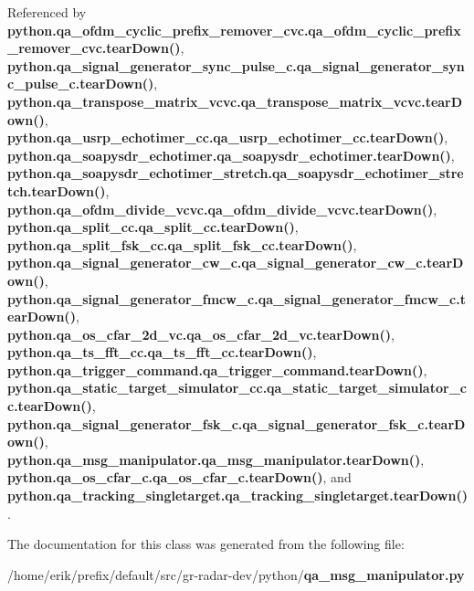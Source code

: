 Referenced by {\bf python.\+qa\+\_\+ofdm\+\_\+cyclic\+\_\+prefix\+\_\+remover\+\_\+cvc.\+qa\+\_\+ofdm\+\_\+cyclic\+\_\+prefix\+\_\+remover\+\_\+cvc.\+tear\+Down()}, {\bf python.\+qa\+\_\+signal\+\_\+generator\+\_\+sync\+\_\+pulse\+\_\+c.\+qa\+\_\+signal\+\_\+generator\+\_\+sync\+\_\+pulse\+\_\+c.\+tear\+Down()}, {\bf python.\+qa\+\_\+transpose\+\_\+matrix\+\_\+vcvc.\+qa\+\_\+transpose\+\_\+matrix\+\_\+vcvc.\+tear\+Down()}, {\bf python.\+qa\+\_\+usrp\+\_\+echotimer\+\_\+cc.\+qa\+\_\+usrp\+\_\+echotimer\+\_\+cc.\+tear\+Down()}, {\bf python.\+qa\+\_\+soapysdr\+\_\+echotimer.\+qa\+\_\+soapysdr\+\_\+echotimer.\+tear\+Down()}, {\bf python.\+qa\+\_\+soapysdr\+\_\+echotimer\+\_\+stretch.\+qa\+\_\+soapysdr\+\_\+echotimer\+\_\+stretch.\+tear\+Down()}, {\bf python.\+qa\+\_\+ofdm\+\_\+divide\+\_\+vcvc.\+qa\+\_\+ofdm\+\_\+divide\+\_\+vcvc.\+tear\+Down()}, {\bf python.\+qa\+\_\+split\+\_\+cc.\+qa\+\_\+split\+\_\+cc.\+tear\+Down()}, {\bf python.\+qa\+\_\+split\+\_\+fsk\+\_\+cc.\+qa\+\_\+split\+\_\+fsk\+\_\+cc.\+tear\+Down()}, {\bf python.\+qa\+\_\+signal\+\_\+generator\+\_\+cw\+\_\+c.\+qa\+\_\+signal\+\_\+generator\+\_\+cw\+\_\+c.\+tear\+Down()}, {\bf python.\+qa\+\_\+signal\+\_\+generator\+\_\+fmcw\+\_\+c.\+qa\+\_\+signal\+\_\+generator\+\_\+fmcw\+\_\+c.\+tear\+Down()}, {\bf python.\+qa\+\_\+os\+\_\+cfar\+\_\+2d\+\_\+vc.\+qa\+\_\+os\+\_\+cfar\+\_\+2d\+\_\+vc.\+tear\+Down()}, {\bf python.\+qa\+\_\+ts\+\_\+fft\+\_\+cc.\+qa\+\_\+ts\+\_\+fft\+\_\+cc.\+tear\+Down()}, {\bf python.\+qa\+\_\+trigger\+\_\+command.\+qa\+\_\+trigger\+\_\+command.\+tear\+Down()}, {\bf python.\+qa\+\_\+static\+\_\+target\+\_\+simulator\+\_\+cc.\+qa\+\_\+static\+\_\+target\+\_\+simulator\+\_\+cc.\+tear\+Down()}, {\bf python.\+qa\+\_\+signal\+\_\+generator\+\_\+fsk\+\_\+c.\+qa\+\_\+signal\+\_\+generator\+\_\+fsk\+\_\+c.\+tear\+Down()}, {\bf python.\+qa\+\_\+msg\+\_\+manipulator.\+qa\+\_\+msg\+\_\+manipulator.\+tear\+Down()}, {\bf python.\+qa\+\_\+os\+\_\+cfar\+\_\+c.\+qa\+\_\+os\+\_\+cfar\+\_\+c.\+tear\+Down()}, and {\bf python.\+qa\+\_\+tracking\+\_\+singletarget.\+qa\+\_\+tracking\+\_\+singletarget.\+tear\+Down()}.



The documentation for this class was generated from the following file\+:\begin{DoxyCompactItemize}
\item 
/home/erik/prefix/default/src/gr-\/radar-\/dev/python/{\bf qa\+\_\+msg\+\_\+manipulator.\+py}\end{DoxyCompactItemize}
